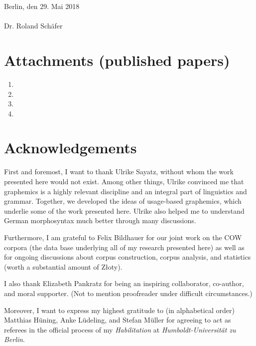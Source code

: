 \documentclass[a4paper, biblatex, charis, linguex]{glossa}
\begin{document}
\noindent Berlin, den 29. Mai 2018\\[1.5\baselineskip]

\noindent \underline{\hspace{8cm}}\\[0.5\baselineskip]
\noindent Dr. Roland Schäfer

\newpage

\setcounter{page}{1}

\tableofcontents

\section*{Attachments (published papers)}
\begin{enumerate}
  \item \RODefArt
  \item \ROWeakN
  \item \ROMeasure
  \item \ROWeil 
\end{enumerate}

\newpage

\section*{Acknowledgements}

First and foremost, I want to thank Ulrike Sayatz, without whom the work presented here would not exist.
Among other things, Ulrike convinced me that graphemics is a highly relevant discipline and an integral part of linguistics and grammar.
Together, we developed the ideas of usage-based graphemics, which underlie some of the work presented here.
Ulrike also helped me to understand German morphosyntax much better through many discussions.

Furthermore, I am grateful to Felix Bildhauer for our joint work on the COW corpora (the data base underlying all of my research presented here) as well as for ongoing discussions about corpus construction, corpus analysis, and statistics (worth a substantial amount of Złoty).

I also thank Elizabeth Pankratz for being an inspiring collaborator, co-author, and moral supporter.
(Not to mention proofreader under difficult circumstances.)

Moreover, I want to express my highest gratitude to (in alphabetical order) Matthias Hüning, Anke Lüdeling, and Stefan Müller for agreeing to act as referees in the official process of my \textit{Habilitation} at \textit{Humboldt-Universität zu Berlin}.
\end{document}
